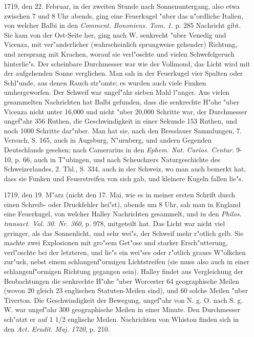 \documentclass[a4paper, 11pt, oneside, polutonikogreek, german]{article}
\begin{document}
1719, den 22. Februar, in der zweiten Stunde nach Sonnenuntergang, also etwa zwischen 7 und 8 Uhr abends, ging eine Feuerkugel "uber das n"ordliche Italien, von welcher Balbi in den \emph{Comment. Bononiens. Tom. 1.} p. 285 Nachricht gibt. Sie kam von der Ost-Seite her, ging nach W. senkrecht "uber Venedig und Vicenza, mit ver"anderlicher (wahrscheinlich sprungweise gehender) Richtung, und zersprang mit Krachen, worauf sie verl"oschte und vielen Schwefelgeruch hinterlie"s. Der scheinbare Durchmesser war wie der Vollmond, das Licht wird mit der aufgehenden Sonne verglichen. Man sah in der Feuerkugel vier Spalten oder Schl"unde, aus denen Rauch str"omte; es wurden auch viele Funken umhergeworfen. Der Schweif war ungef"ahr sieben Mahl l"anger. Aus vielen gesammelten Nachrichten hat Balbi gefunden, dass die senkrechte H"ohe "uber Vicenza nicht unter 16,000 und nicht "uber 20,000 Schritte war, der Durchmesser ungef"ahr 356 Ruthen, die Geschwindigkeit in einer Sekunde 153 Ruthen, und noch 1000 Schritte dar"uber. Man hat sie, nach den Bresslauer Sammlungen, 7. Versuch, S. 165, auch in Augsburg, N"urnberg, und andern Gegenden Deutschlands gesehen; nach Camerarius in den \emph{Ephem. Nat. Curios. Centur.} 9-10, p. 66, auch in T"ubingen, und nach Scheuchzers Naturgeschichte des Schweizerlandes, 2. Thl., S. 334, auch in der Schweiz, wo man auch bemerkt hat, dass sie Funken und Feuerstreifen von sich gab, und kleinere Kugeln fallen lie"s.

1719, den 19. M"arz (nicht den 17. Mai, wie es in meiner ersten Schrift durch einen Schreib- oder Druckfehler hei"st), abends um 8 Uhr, sah man in England eine Feuerkugel, von welcher Halley Nachrichten gesammelt, und in den \emph{Philos. transact. Vol. 30. Nr. 360}, p. 978, mitgeteilt hat. Das Licht war nicht viel geringer, als das Sonnenlicht, und sehr wei"s, der Schweif mehr r"otlich gelb. Sie machte zwei Explosionen mit gro"sem Get"ose und starker Ersch"utterung, verl"oschte bei der letzteren, und lie"s ein wei"ses oder r"otlich graues W"olkchen zur"uck, nebst einem schlangenf"ormigen Lichtstreifen (sie muss also auch in einer schlangenf"ormigen Richtung gegangen sein). Halley findet aus Vergleichung der Beobachtungen die senkrechte H"ohe "uber Worcester 64 geographische Meilen (wovon 20 gleich 23 englischen Statuten-Meilen sind), und 60 solche Meilen "uber Tiverton. Die Geschwindigkeit der Bewegung, ungef"ahr von N. g. O. nach S. g. W. war ungef"ahr 300 geographische Meilen in einer Minute. Den Durchmesser sch"atzt er auf 1 1/2 englische Meilen. Nachrichten von Whiston finden sich in den \emph{Act. Erudit. Maj. 1720}, p. 210.
\end{document}
